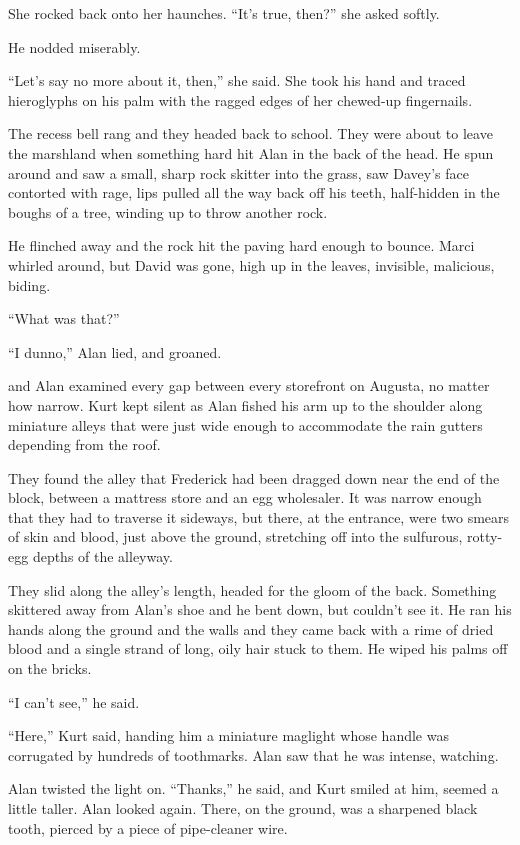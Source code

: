 She rocked back onto her haunches.  ``It's true, then?'' she asked
softly.

He nodded miserably.

``Let's say no more about it, then,'' she said.  She took his hand and
traced hieroglyphs on his palm with the ragged edges of her chewed-up
fingernails.

The recess bell rang and they headed back to school.  They were about
to leave the marshland when something hard hit Alan in the back of the
head.  He spun around and saw a small, sharp rock skitter into the
grass, saw Davey's face contorted with rage, lips pulled all the way
back off his teeth, half-hidden in the boughs of a tree, winding up to
throw another rock.

He flinched away and the rock hit the paving hard enough to bounce. 
Marci whirled around, but David was gone, high up in the leaves,
invisible, malicious, biding.

``What was that?''

``I dunno,'' Alan lied, and groaned.

 and Alan examined every gap between every storefront on Augusta,
no matter how narrow.  Kurt kept silent as Alan fished his arm up to
the shoulder along miniature alleys that were just wide enough to
accommodate the rain gutters depending from the roof.

They found the alley that Frederick had been dragged down near the end
of the block, between a mattress store and an egg wholesaler.  It was
narrow enough that they had to traverse it sideways, but there, at the
entrance, were two smears of skin and blood, just above the ground,
stretching off into the sulfurous, rotty-egg depths of the alleyway.

They slid along the alley's length, headed for the gloom of the back. 
Something skittered away from Alan's shoe and he bent down, but
couldn't see it.  He ran his hands along the ground and the walls and
they came back with a rime of dried blood and a single strand of long,
oily hair stuck to them.  He wiped his palms off on the bricks.

``I can't see,'' he said.

``Here,'' Kurt said, handing him a miniature maglight whose handle was
corrugated by hundreds of toothmarks.  Alan saw that he was intense,
watching.

Alan twisted the light on.  ``Thanks,'' he said, and Kurt smiled at
him, seemed a little taller.  Alan looked again.  There, on the
ground, was a sharpened black tooth, pierced by a piece of
pipe-cleaner wire.


